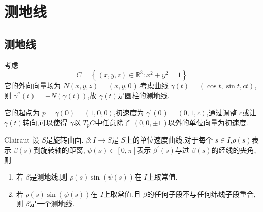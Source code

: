 \documentclass[../../main.tex]{subfiles}
\begin{document}
\chapter{ 测地线 }

\section{测地线}
\begin{example}[圆柱]
    考虑 \[
    C =  \left\{ \left( x,y,z \right)\in \mathbb{R} ^{3}:x^{2}+ y^{2}= 1  \right\}
    \]它的外向向量场为 \(  N\left( x,y,z \right)=  \left( x,y,0 \right)  \).考虑曲线 \(   \gamma \left( t \right)= \left( \cos t,\sin t,ct \right)    \),则 \(   \gamma ^{\prime \prime} \left( t \right)= -N\left(  \gamma \left( t \right)  \right)    \),故 \(   \gamma \left( t \right)   \)是圆柱的测地线. 
    
    它的起点为 \(  p =   \gamma \left( 0 \right)= \left( 1,0,0 \right)    \),初速度为 \(   \gamma ^{\prime} \left( 0 \right)= \left( 0,1,c \right)    \),通过调整 \(  c  \)或让 \(   \gamma \left( t \right)   \)转向,可以使得 \(   \gamma   \)以 \(  T_{p}C  \)中任意除了 \(  \left( 0,0,\pm 1 \right)   \)以外的单位向量为初速度.     
\end{example}

\begin{theorem}{Clairaut}
    设 \(  S  \)是旋转曲面. \(  \beta :I\to S  \)是 \(  S  \)上的单位速度曲线.对于每个 \(  s \in I  \),\(  \rho \left( s \right)   \)表示 \( \beta \left( s \right)   \)到旋转轴的距离, \(  \psi \left( s \right) \in \left[ 0,\pi  \right]    \)表示 \(  \beta ^{\prime} \left( s \right)   \)与过 \(  \beta \left( s \right)   \)的经线的夹角,则
    \begin{enumerate}
        \item 若 \(  \beta   \)是测地线,则 \(  \rho \left( s \right)\sin \left( \psi \left( s \right)  \right)    \)在 \(  I  \)上取常值.
        \item 若 \(  \rho \left( s \right)\sin \left( \psi \left( s \right)  \right)    \)在 \(  I  \)上取常值,且 \(  \beta   \)的任何子段不与任何纬线子段重合, 则 \(  \beta   \)是一个测地线.      
    \end{enumerate}
             
\end{theorem}
\end{document}
